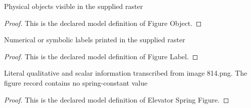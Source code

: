 \begin{definition}
  \label{def:physics:phyx-mini-0814:phyxminiproblems-problemphyxmini0814-figureobject}
  Physical objects visible in the supplied raster
\end{definition}
\begin{proof}
  This is the declared model definition of Figure Object.
\end{proof}
\begin{definition}
  \label{def:physics:phyx-mini-0814:phyxminiproblems-problemphyxmini0814-figurelabel}
  Numerical or symbolic labels printed in the supplied raster
\end{definition}
\begin{proof}
  This is the declared model definition of Figure Label.
\end{proof}
\begin{definition}
  \label{def:physics:phyx-mini-0814:phyxminiproblems-problemphyxmini0814-elevatorspringfigure}
  Literal qualitative and scalar information transcribed from image 814.png. The figure record contains no spring-constant value
\end{definition}
\begin{proof}
  This is the declared model definition of Elevator Spring Figure.
\end{proof}
